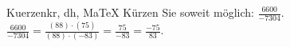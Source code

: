 \begin{MAufgabe}{Kuerzen}{kr, dh, MaTeX}
K\"urzen Sie soweit m\"oglich: $\frac{6600}{-7304}$.\\ 
\ifLsg\MLoesung
\quad $\frac{6600}{-7304}=\frac{(88)\cdot(75)}{(88)\cdot(-83)}=\frac{75}{-83}=\frac{-75}{83}$.\else\relax\fi
 \end{MAufgabe}